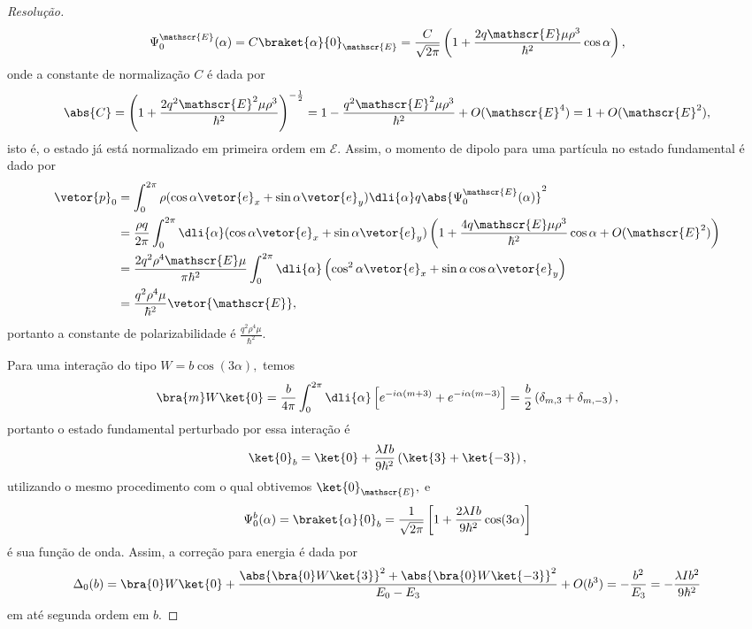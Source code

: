 \begin{proof}[Resolução]
   \begin{equation*}
      \Psi^\mathscr{E}_0(\alpha) = C\braket{\alpha}{0}_\mathscr{E} = \frac{C}{\sqrt{2\pi}}\left(1 + \frac{2q \mathscr{E} \mu \rho^3}{\hbar^2} \cos\alpha\right),
   \end{equation*}
   onde a constante de normalização \(C\) é dada por 
   \begin{equation*}
      \abs{C} = \left(1 + \frac{2q^2 \mathscr{E}^2\mu \rho^3}{\hbar^2}\right)^{-\frac12} = 1 - \frac{q^2 \mathscr{E}^2\mu\rho^3}{\hbar^2} + O(\mathscr{E}^4) = 1 + O(\mathscr{E}^2),
   \end{equation*}
   isto é, o estado já está normalizado em primeira ordem em \(\mathscr{E}.\) Assim, o momento de dipolo para uma partícula no estado fundamental é dado por
   \begin{align*}
      \vetor{p}_0 &= \int_{0}^{2\pi} \rho(\cos\alpha\vetor{e}_x + \sin\alpha \vetor{e}_y)\dli{\alpha} q\abs{\Psi_0^{\mathscr{E}}(\alpha)}^2\\
                  &= \frac{\rho q}{2\pi} \int_0^{2\pi} \dli{\alpha} (\cos\alpha\vetor{e}_x + \sin\alpha \vetor{e}_y)\left(1 + \frac{4q \mathscr{E} \mu \rho^3}{\hbar^2} \cos\alpha + O(\mathscr{E}^2)\right)\\
                  &= \frac{2q^2 \rho^4 \mathscr{E} \mu}{\pi \hbar^2}\int_0^{2\pi}\dli{\alpha}\left(\cos^2\alpha \vetor{e}_x + \sin\alpha \cos\alpha\vetor{e}_y\right)\\
                  &= \frac{q^2 \rho^4 \mu}{\hbar^2}\vetor{\mathscr{E}},
   \end{align*}
   portanto a constante de polarizabilidade é \(\frac{q^2 \rho^4 \mu}{\hbar^2}.\)

   Para uma interação do tipo \(W = b \cos(3\alpha),\) temos
   \begin{equation*}
      \bra{m}W\ket{0} = \frac{b}{4\pi} \int_0^{2\pi} \dli{\alpha} \left[e^{-i\alpha (m + 3)} + e^{-i\alpha(m-3)}\right] = \frac{b}{2} \left(\delta_{m,3} + \delta_{m,-3}\right),
   \end{equation*}
   portanto o estado fundamental perturbado por essa interação é
   \begin{equation*}
      \ket{0}_b = \ket{0} + \frac{\lambda I b}{9\hbar^2} \left(\ket{3} + \ket{-3}\right),
   \end{equation*}
   utilizando o mesmo procedimento com o qual obtivemos \(\ket{0}_\mathscr{E},\) e
   \begin{equation*}
      \Psi_0^b(\alpha) = \braket{\alpha}{0}_b = \frac{1}{\sqrt{2\pi}}\left[1 + \frac{2\lambda I b}{9\hbar^2}\cos(3\alpha)\right]
   \end{equation*}
   é sua função de onda. Assim, a correção para energia é dada por
   \begin{equation*}
      \Delta_0(b) = \bra{0}W\ket{0} + \frac{\abs{\bra{0}W\ket{3}}^2 + \abs{\bra{0}W\ket{-3}}^2}{E_0 - E_3} + O(b^3) 
                  = -\frac{b^2}{E_3}
                  = -\frac{\lambda I b^2}{9\hbar^2}
   \end{equation*}
   em até segunda ordem em \(b.\)
\end{proof}
